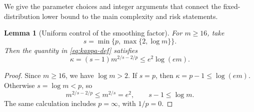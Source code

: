 \documentclass[11pt]{article}
\newtheorem{lemma}[lemma]{Lemma}
\theoremstyle{definition}
\theoremstyle{remark}
\begin{document}
We give the parameter choices and integer arguments that connect the
fixed-distribution lower bound to the main complexity and risk statements.

\begin{lemma}[Uniform control of the smoothing factor]
\label{lem:kappa-uniform}
For $m\ge16$, take
\[
 s=\min\{p,\max\{2,\log m\}\}.
\]
Then the quantity in \cref{eq:kappa-def} satisfies
\[
 \kappa=(s-1)m^{2/s-2/p}\le e^2\log(em).
\]
\end{lemma}

\begin{proof}
Since $m\ge16$, we have $\log m>2$.
If $s=p$, then $\kappa=p-1\le\log(em)$.
Otherwise $s=\log m<p$, so
\[
 m^{2/s-2/p}\le m^{2/s}=e^2,
 \qquad s-1\le\log m.
\]
The same calculation includes $p=\infty$, with $1/p=0$.
\end{proof}
\end{document}
